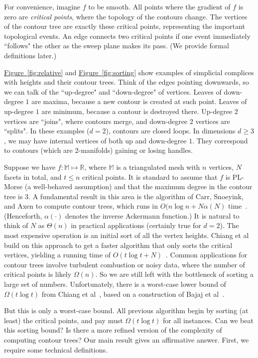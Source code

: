 \documentclass[11pt]{article}
\theoremstyle{definition}
\newcommand{\MM}{\mathbb{M}}
\newcommand{\RR}{\mathbb{R}}
\newcommand{\Fig}[1]{\hyperref[fig:#1]{Figure~\ref*{fig:#1}}} %
\begin{document}
For convenience, imagine $f$ to be smooth. All points where the gradient of $f$ is zero are \emph{critical points},
where the topology of the contours change. The vertices of the contour tree are exactly these critical points,
representing the important topological events. An edge connects two critical points if one event immediately ``follows"
the other as the sweep plane makes its pass. (We provide formal definitions later.) 

\Fig{relative} and \Fig{sorting} show examples of simplicial complices with heights and their contour trees.
Think of the edges pointing downwards, so we can talk of the ``up-degree" and ``down-degree" of vertices.
Leaves of down-degree $1$ are maxima, because a new contour is created at such point. Leaves of up-degree
$1$ are minimum, because a contour is destroyed there. Up-degree $2$ vertices are ``joins", where contours
merge, and down-degree $2$ vertices are ``splits". In these examples ($d=2$), contours are closed loops.
In dimensions $d \geq 3$, we may have internal
vertices of both up and down-degree $1$. They correspond to contours (which are $2$-manifolds) gaining or losing handles.

Suppose we have $f: \MM \mapsto \RR$, where $\MM$ is a triangulated mesh with $n$ vertices, $N$ facets in total, and $t \leq n$ critical points.
It is standard to assume that $f$ is PL-Morse (a well-behaved assumption) and that the maximum degree in the contour tree
is $3$. A fundamental result in this area is the algorithm of Carr, Snoeyink, and Axen to compute contour trees,
which runs in $O(n\log n + N\alpha(N)$ time~\cite{csa-cctad-00}. (Henceforth, $\alpha(\cdot)$ denotes the inverse
Ackermann function.) It is natural to think of $N$ as $\Theta(n)$
in practical applications (certainly true for $d=2$). The most expensive operation is an initial sort of all the vertex
heights. Chiang et al build on this approach to get a faster algorithm that only sorts the critical vertices,
yielding a running time of $O(t\log t + N)$~\cite{cllr-sooscctmp-05}.
Common applications for contour trees involve turbulent combustion or noisy data, where the number of critical points is likely $\Omega(n)$.
So we are still left with the bottleneck of sorting a large set of numbers. Unfortunately, there is a worst-case
lower bound of $\Omega(t\log t)$ from Chiang et al~\cite{cllr-sooscctmp-05}, based on a construction of Bajaj et al~\cite{BaKr+98}.

But this is only a worst-case bound. All previous algorithm begin by sorting (at least) the critical points, and
pay must $\Omega(t\log t)$ for all instances. Can we beat this sorting bound? Is there a more refined version of the complexity
of computing contour trees? Our main result gives an affirmative answer. First, we require some technical definitions.
\end{document}
